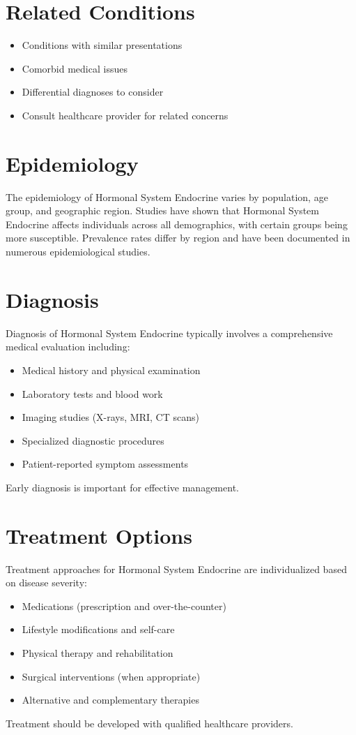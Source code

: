 \section*{Related Conditions}
\begin{itemize}
  \item Conditions with similar presentations
  \item Comorbid medical issues
  \item Differential diagnoses to consider
  \item Consult healthcare provider for related concerns
\end{itemize}

\section*{Epidemiology}
The epidemiology of Hormonal System Endocrine varies by population, age group, and geographic region. Studies have shown that Hormonal System Endocrine affects individuals across all demographics, with certain groups being more susceptible. Prevalence rates differ by region and have been documented in numerous epidemiological studies.

\section*{Diagnosis}
Diagnosis of Hormonal System Endocrine typically involves a comprehensive medical evaluation including:
\begin{itemize}
  \item Medical history and physical examination
  \item Laboratory tests and blood work
  \item Imaging studies (X-rays, MRI, CT scans)
  \item Specialized diagnostic procedures
  \item Patient-reported symptom assessments
\end{itemize}
Early diagnosis is important for effective management.

\section*{Treatment Options}
Treatment approaches for Hormonal System Endocrine are individualized based on disease severity:
\begin{itemize}
  \item Medications (prescription and over-the-counter)
  \item Lifestyle modifications and self-care
  \item Physical therapy and rehabilitation
  \item Surgical interventions (when appropriate)
  \item Alternative and complementary therapies
\end{itemize}
Treatment should be developed with qualified healthcare providers.

